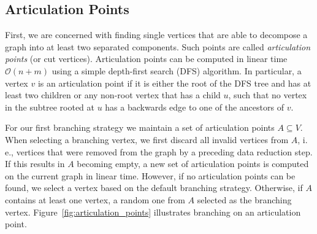 \documentclass[a4paper,UKenglish,cleveref, autoref, thm-restate]{lipics-v2021}
\newcommand{\ie}{i.\,e.,\xspace}
\begin{document}
\subsection{Articulation Points}
First, we are concerned with finding single vertices that are able to decompose a graph into at least two separated components.
Such points are called \emph{articulation points} (or cut vertices).
Articulation points can be computed in linear time $\mathcal{O}(n+m)$ using a simple depth-first search (DFS) algorithm.
In particular, a vertex $v$ is an articulation point if it is either the root of
the DFS tree and has at least two children or any non-root vertex that has a child $u$, such that no vertex in
the subtree rooted at $u$ has a backwards edge to one of the ancestors of
$v$.

For our first branching strategy we maintain a set of articulation points $A \subseteq V$.
When selecting a branching vertex, we first discard all invalid vertices from
$A$, \ie vertices that were removed from the graph by a preceding data reduction step.
If this results in $A$ becoming empty, a new set of articulation points is computed on the current graph in linear time.
However, if no articulation points can be found, we select a vertex based on the default branching strategy.
Otherwise, if $A$ contains at least one vertex, a random one from $A$ selected as the branching
vertex. Figure~\ref{fig:articulation_points} illustrates branching on an
articulation point.
\end{document}
